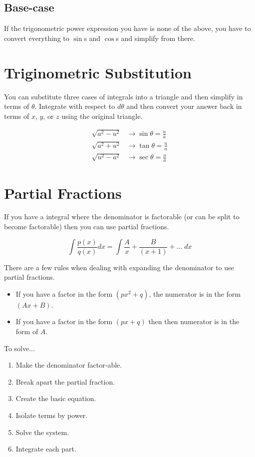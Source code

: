 \subsection{Base-case}
If the trigonometric power expression you have is none of the above, you have to
convert everything to $\sin$s and $\cos$s and simplify from there.

\section{Triginometric Substitution}
You can substitute three cases of integrals into a triangle and then simplify
in terms of $\theta$. Integrate with respect to $d\theta$ and then convert your
answer back in terms of $x$, $y$, or $z$ using the original triangle.

\begin{align}
  \sqrt{a^2-u^2} &\to \sin\theta = \frac{u}{a} \\
  \sqrt{a^2+u^2} &\to \tan\theta = \frac{u}{a} \\
  \sqrt{u^2-a^2} &\to \sec\theta = \frac{u}{a}
\end{align}

\section{Partial Fractions}
If you have a integral where the denominator is factorable (or can be split to
become factorable) then you can use partial fractions.

\begin{equation}
  \int \frac{p(x)}{q(x)} dx = \int {\frac{A}{x}+\frac{B}{(x+1)}+\ldots\; } dx
\end{equation}

There are a few rules when dealing with expanding the denominator to use partial
fractions.
\begin{itemize}
  \item If you have a factor in the form $(px^2+q)$, the numerator is in the
    form $(Ax+B)$.
  \item If you have a factor in the form $(px+q)$ then then numerator is in the
    form of $A$.
\end{itemize}

To solve...
\begin{enumerate}
  \item Make the denominator factor-able.
  \item Break apart the partial fraction.
  \item Create the basic equation.
  \item Isolate terms by power.
  \item Solve the system.
  \item Integrate each part.
\end{enumerate}
